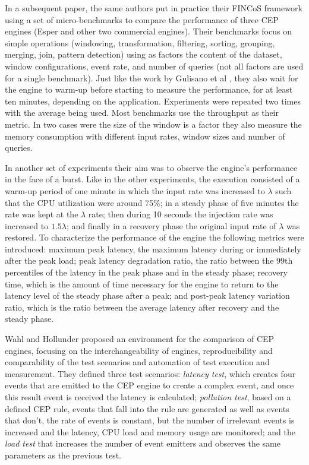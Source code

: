 \documentclass[ppgc,diss,english]{iiufrgs}
\begin{document}
In a subsequent paper, the same authors put in practice their FINCoS framework \cite{mendes2009performance} using a set of micro-benchmarks to compare the performance of three CEP engines (Esper and other two commercial engines). Their benchmarks focus on simple operations (windowing, transformation, filtering, sorting, grouping, merging, join, pattern detection) using as factors the content of the dataset, window configurations, event rate, and number of queries (not all factors are used for a single benchmark). Just like the work by Gulisano et al \cite{gulisano2012streamcloud}, they also wait for the engine to warm-up before starting to measure the performance, for at least ten minutes, depending on the application. Experiments were repeated two times with the average being used. Most benchmarks use the throughput as their metric. In two cases were the size of the window is a factor they also measure the memory consumption with different input rates, window sizes and number of queries.

In another set of experiments their aim was to observe the engine's performance in the face of a burst. Like in the other experiments, the execution consisted of a warm-up period of one minute in which the input rate was increased to $\lambda$ such that the CPU utilization were around 75\%; in a steady phase of five minutes the rate was kept at the $\lambda$ rate; then during 10 seconds the injection rate was increased to $1.5\lambda$; and finally in a recovery phase the original input rate of $\lambda$ was restored. To characterize the performance of the engine the following metrics were introduced: maximum peak latency, the maximum latency during or immediately after the peak load; peak latency degradation ratio, the ratio between the 99th percentiles of the latency in the peak phase and in the steady phase; recovery time, which is the amount of time necessary for the engine to return to the latency level of the steady phase after a peak; and post-peak latency variation ratio, which is the ratio between the average latency after recovery and the steady phase.


Wahl and Hollunder \cite{wahl2012performance} proposed an environment for the comparison of CEP engines, focusing on the interchangeability of engines, reproducibility and comparability of the test scenarios and automation of test execution and measurement. They defined three test scenarios: \emph{latency test}, which creates four events that are emitted to the CEP engine to create a complex event, and once this result event is received the latency is calculated; \emph{pollution test}, based on a defined CEP rule, events that fall into the rule are generated as well as events that don't, the rate of events is constant, but the number of irrelevant events is increased and the latency, CPU load and memory usage are monitored; and the \emph{load test} that increases the number of event emitters and observes the same parameters as the previous test.
\end{document}
